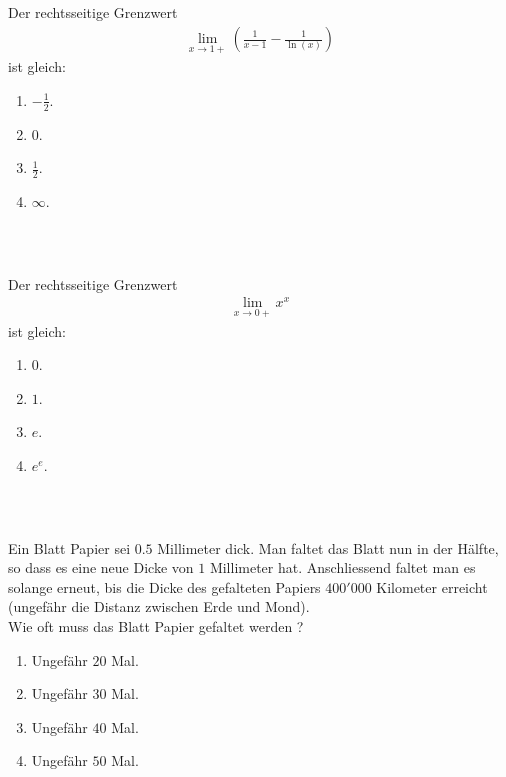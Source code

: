 \subsection*{}
Der rechtsseitige Grenzwert
\begin{align*}
	\lim\limits_{x \to 1 +}
	\left(
	\frac{1}{x-1} - \frac{1}{\ln(x)}
	\right)
\end{align*}
ist gleich:
\renewcommand{\labelenumi}{(\alph{enumi})}
\begin{enumerate}
\item 
$ -\frac{1}{2}$.
\item
$ 0$.
\item
$ \frac{1}{2}$.
\item
$ \infty$.
\end{enumerate}
\ \\
\subsection*{}
Der rechtsseitige Grenzwert
\begin{align*}
	\lim\limits_{x \to 0 +}
	x^x
\end{align*}
ist gleich:
\renewcommand{\labelenumi}{(\alph{enumi})}
\begin{enumerate}
	\item 
	$0$.
	\item
	$1$.
	\item
	$e$.
	\item
	$e^e$.	
\end{enumerate}
\ \\
\subsection*{}
Ein Blatt Papier sei $ 0.5 $ Millimeter dick. Man faltet das Blatt nun in der Hälfte, so dass es eine neue Dicke von $ 1 $ Millimeter hat.
Anschliessend faltet man es solange erneut, bis die Dicke des gefalteten Papiers $ 400'000 $ Kilometer erreicht (ungefähr die Distanz zwischen Erde und Mond).\\
Wie oft muss das Blatt Papier gefaltet werden ? 
\renewcommand{\labelenumi}{(\alph{enumi})}
\begin{enumerate}
\item 
Ungefähr $ 20 $ Mal.
\item
Ungefähr $ 30 $ Mal.
\item
Ungefähr $ 40 $ Mal.
\item
Ungefähr $ 50 $ Mal.
\end{enumerate}
\ \\
